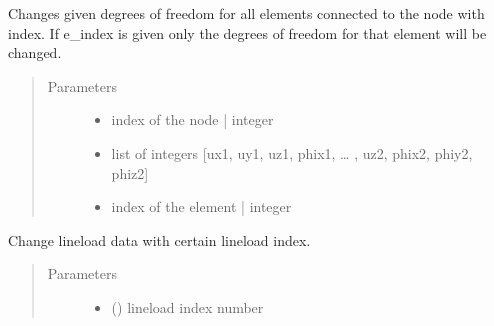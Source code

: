 \documentclass[letterpaper,10pt,english]{sphinxmanual}
\begin{document}
\begin{fulllineitems}
\begin{fulllineitems}
\label{\detokenize{api:beamon.database.Database.change_edof}}
Changes given degrees of freedom for all elements connected to the node with index.
If e\_index is given only the degrees of freedom for that element will be changed.
\begin{quote}\begin{description}
\item[{Parameters}] \leavevmode\begin{itemize}
\item {} 
 \textendash{} index of the node | integer

\item {} 
 \textendash{} list of integers {[}ux1, uy1, uz1, phix1, … , uz2, phix2, phiy2, phiz2{]}

\item {} 
 \textendash{} index of the element | integer

\end{itemize}

\end{description}\end{quote}

\end{fulllineitems}


\begin{fulllineitems}
\label{\detokenize{api:beamon.database.Database.change_lineload}}
Change lineload data with certain lineload index.
\begin{quote}\begin{description}
\item[{Parameters}] \leavevmode\begin{itemize}
\item {} 
 () \textendash{} lineload index number


\end{itemize}
\end{description}
\end{quote}
\end{fulllineitems}
\end{fulllineitems}
\end{document}
